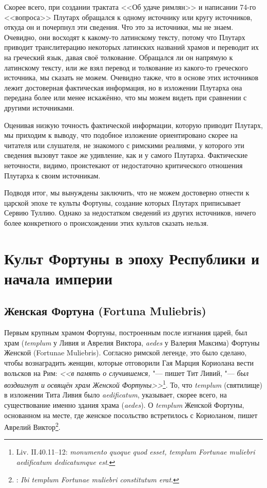 Скорее всего, при создании трактата <<Об удаче римлян>> и написании 74-го <<вопроса>> Плутарх обращался к одному источнику или кругу источников, откуда он и почерпнул эти сведения. Что это за источники, мы не знаем. Очевидно, они восходят к какому-то латинскому тексту, потому что Плутарх приводит транслитерацию некоторых латинских названий храмов и переводит их на греческий язык, давая своё толкование. Обращался ли он напрямую к латинскому тексту, или же взял перевод и толкование из какого-то греческого источника, мы сказать не можем. Очевидно также, что в основе этих источников лежит достоверная фактическая информация, но в изложении Плутарха она передана более или менее искажённо, что мы можем видеть при сравнении с другими источниками.

Оценивая низкую точность фактической информации, которую приводит Плутарх, мы приходим к выводу, что подобное изложение ориентировано скорее на читателя или слушателя, не знакомого с римскими реалиями, у которого эти сведения вызовут такое же удивление, как и у самого Плутарха. Фактические неточности, видимо, проистекают от недостаточно критического отношения Плутарха к своим источникам.

Подводя итог, мы вынуждены заключить, что не можем достоверно отнести к царской эпохе те культы Фортуны, создание которых Плутарх приписывает Сервию Туллию. Однако за недостатком сведений из других источников, ничего более конкретного о происхождении этих культов сказать нельзя.

\section{Культ Фортуны в эпоху Республики и начала империи}\label{RespublicaeCulti}

\subsection{Женская Фортуна (Fortuna Muliebris)}\label{FortunaMuliebris}

Первым крупным храмом Фортуны, построенным после изгнания царей, был храм (\textit{templum} у Ливия и Аврелия Виктора, \textit{aedes} у Валерия Максима) Фортуны Женской (Fortunae Muliebris). Согласно римской легенде, это было сделано, чтобы вознаградить женщин, которые отговорили Гая Марция Кориолана вести вольсков на Рим: \textit{<<в память о случившемся,} "--- пишет Тит Ливий, "--- \textit{был воздвигнут и освящён храм Женской Фортуны>>}\footnote{ Liv. II.40.11--12: \textit{monumento quoque quod esset, templum Fortunae muliebri aedificatum dedicatumque est}.}. То, что \textit{templum} (святилище) в изложении Тита Ливия было \textit{aedificatum}, указывает, скорее всего, на существование именно здания храма (\textit{aedes}). О \textit{templum} Женской Фортуны, основанном на месте, где женское посольство встретилось с Кориоланом, пишет Аврелий Виктор\footnote{: \textit{Ibi templum Fortunae muliebri constitutum erat}.}.

